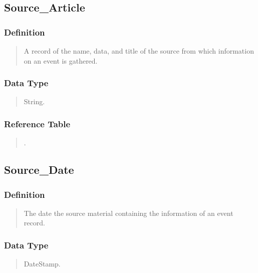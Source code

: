 \documentclass[letterpaper,10pt,english]{sphinxmanual}
\begin{document}
\subsection{Source\_Article}
\label{\detokenize{database_schema:source-article}}

\subsubsection{Definition}
\label{\detokenize{database_schema:id14}}\begin{quote}

\sphinxAtStartPar
A record of the name, data, and title of the source from which information on an event is gathered.
\end{quote}


\subsubsection{Data Type}
\label{\detokenize{database_schema:id15}}\begin{quote}

\sphinxAtStartPar
String.
\end{quote}


\subsubsection{Reference Table}
\label{\detokenize{database_schema:id16}}\begin{quote}

\sphinxAtStartPar
{\hyperref[\detokenize{database_schema:overview-table}]{}}.
\end{quote}


\subsection{Source\_Date}
\label{\detokenize{database_schema:source-date}}

\subsubsection{Definition}
\label{\detokenize{database_schema:id17}}\begin{quote}

\sphinxAtStartPar
The date the source material containing the information of an event record.
\end{quote}


\subsubsection{Data Type}
\label{\detokenize{database_schema:id18}}\begin{quote}

\sphinxAtStartPar
DateStamp.
\end{quote}
\end{document}
